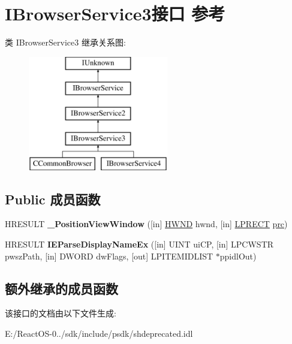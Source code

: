 \hypertarget{interface_i_browser_service3}{}\section{I\+Browser\+Service3接口 参考}
\label{interface_i_browser_service3}
类 I\+Browser\+Service3 继承关系图\+:\begin{figure}[H]
\begin{center}
\leavevmode
\includegraphics[height=5.000000cm]{interface_i_browser_service3}
\end{center}
\end{figure}
\subsection*{Public 成员函数}
\begin{DoxyCompactItemize}
\item 
\mbox{\label{interface_i_browser_service3_a016ba8de5b0272aed0de131c5094831a}} 
H\+R\+E\+S\+U\+LT {\bfseries \+\_\+\+Position\+View\+Window} (\mbox{[}in\mbox{]} \hyperlink{interfacevoid}{H\+W\+ND} hwnd, \mbox{[}in\mbox{]} \hyperlink{structtag_r_e_c_t}{L\+P\+R\+E\+CT} \hyperlink{structtag_r_e_c_t}{prc})
\item 
\mbox{\label{interface_i_browser_service3_a3cfcf655611b4dc10821639b27680c49}} 
H\+R\+E\+S\+U\+LT {\bfseries I\+E\+Parse\+Display\+Name\+Ex} (\mbox{[}in\mbox{]} U\+I\+NT ui\+CP, \mbox{[}in\mbox{]} L\+P\+C\+W\+S\+TR pwsz\+Path, \mbox{[}in\mbox{]} D\+W\+O\+RD dw\+Flags, \mbox{[}out\mbox{]} L\+P\+I\+T\+E\+M\+I\+D\+L\+I\+ST $\ast$ppidl\+Out)
\end{DoxyCompactItemize}
\subsection*{额外继承的成员函数}


该接口的文档由以下文件生成\+:\begin{DoxyCompactItemize}
\item 
E\+:/\+React\+O\+S-\/0../sdk/include/psdk/shdeprecated.\+idl\end{DoxyCompactItemize}
